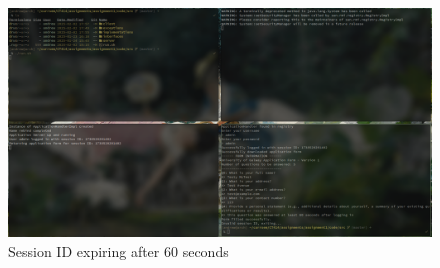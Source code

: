 \documentclass[a4paper]{article}
\begin{document}
\begin{figure}[H]
    \centering
    \includegraphics[width=\textwidth]{./images/invalidsessionid.png}
    \caption{Session ID expiring after 60 seconds}
\end{figure}
\end{document}

